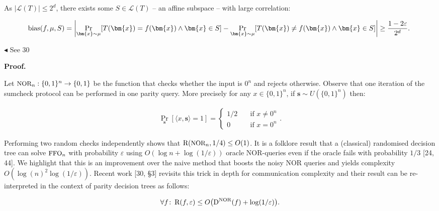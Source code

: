\documentclass[10pt,a4paper]{article}
\begin{document}
As $|\mathcal{L}(T)|\leq 2^{d}$, there exists some $S\in\mathcal{L}(T)$ – an affine subspace – with large correlation:\par


\[\begin{gathered}
{\textup{bias}}(f,\mu,S)=\left|\Pr_{\bm{x}\sim\mu}[T(\bm{x})=f(\bm{x})\wedge\bm{x}\in S]-\Pr_{\bm{x}\sim\mu}[T(\bm{x})\neq f(\bm{x})\wedge\bm{x}\in S]\right|\geq\frac{1-2\varepsilon}{2^{d}}.\
\end{gathered}\]


$\blacktriangleleft$
See 30\par





\par\medskip\noindent\textbf{Proof.}\par




Let ${\textrm{\small{NOR}}}_{n}:\{0,1\}^{n}\to\{0,1\}$ be the function that checks whether the input is $0^{n}$ and rejects otherwise. Observe that one iteration of the sumcheck protocol can be performed in one parity query. More precisely for any $x\in\{0,1\}^{n}$, if $\bm{s}\sim U\left(\{0,1\}^{n}\right)$ then:\par


\[\begin{gathered}
\Pr_{\bm{s}}[\langle x,\bm{s}\rangle=1]=\begin{cases}1/2&\quad\text{if $x\neq 0^{n}$}\\
0&\quad\text{if $x=0^{n}$}\end{cases}.
\end{gathered}\]


Performing two random checks independently shows that ${\textup{R}}({\textrm{\small{NOR}}}_{n},1/4)\leq O(1)$. It is a folklore result that a (classical) randomised decision tree can solve ${\textrm{\small{FFO}}}_{n}$ with probability $\varepsilon$ using $O(\log n+\log(1/\varepsilon))$ oracle NOR-queries even if the oracle fails with probability $1/3$ [24, 44]. We highlight that this is an improvement over the naive method that boosts the noisy NOR queries and yields complexity $O(\log(n)^{2}\log(1/\varepsilon))$. Recent work [30, §3] revisits this trick in depth for communication complexity and their result can be re-interpreted in the context of parity decision trees as follows:\par


\[\begin{gathered}
\forall f\colon\,{\textup{R}}(f,\varepsilon)\leq O\big{(}{\textup{D}}^{{\textrm{\small{\scriptsize NOR}}}}(f)+\log(1/\varepsilon)\big{)}.
\end{gathered}\]
\end{document}
